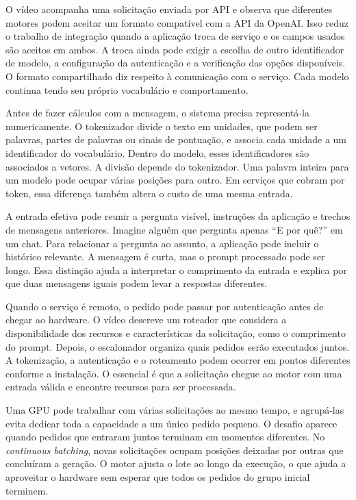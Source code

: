 \documentclass[12pt,a4paper]{article}
\begin{document}
O vídeo acompanha uma solicitação enviada por API e observa que diferentes motores podem aceitar um formato compatível com a API da OpenAI. Isso reduz o trabalho de integração quando a aplicação troca de serviço e os campos usados são aceitos em ambos. A troca ainda pode exigir a escolha de outro identificador de modelo, a configuração da autenticação e a verificação das opções disponíveis. O formato compartilhado diz respeito à comunicação com o serviço. Cada modelo continua tendo seu próprio vocabulário e comportamento.

Antes de fazer cálculos com a mensagem, o sistema precisa representá-la numericamente. O tokenizador divide o texto em unidades, que podem ser palavras, partes de palavras ou sinais de pontuação, e associa cada unidade a um identificador do vocabulário. Dentro do modelo, esses identificadores são associados a vetores. A divisão depende do tokenizador. Uma palavra inteira para um modelo pode ocupar várias posições para outro. Em serviços que cobram por token, essa diferença também altera o custo de uma mesma entrada.

A entrada efetiva pode reunir a pergunta visível, instruções da aplicação e trechos de mensagens anteriores. Imagine alguém que pergunta apenas ``E por quê?'' em um chat. Para relacionar a pergunta ao assunto, a aplicação pode incluir o histórico relevante. A mensagem é curta, mas o prompt processado pode ser longo. Essa distinção ajuda a interpretar o comprimento da entrada e explica por que duas mensagens iguais podem levar a respostas diferentes.

Quando o serviço é remoto, o pedido pode passar por autenticação antes de chegar ao hardware. O vídeo descreve um roteador que considera a disponibilidade dos recursos e características da solicitação, como o comprimento do prompt. Depois, o escalonador organiza quais pedidos serão executados juntos. A tokenização, a autenticação e o roteamento podem ocorrer em pontos diferentes conforme a instalação. O essencial é que a solicitação chegue ao motor com uma entrada válida e encontre recursos para ser processada.

Uma GPU pode trabalhar com várias solicitações ao mesmo tempo, e agrupá-las evita dedicar toda a capacidade a um único pedido pequeno. O desafio aparece quando pedidos que entraram juntos terminam em momentos diferentes. No \textit{continuous batching}, novas solicitações ocupam posições deixadas por outras que concluíram a geração. O motor ajusta o lote ao longo da execução, o que ajuda a aproveitar o hardware sem esperar que todos os pedidos do grupo inicial terminem.
\end{document}

